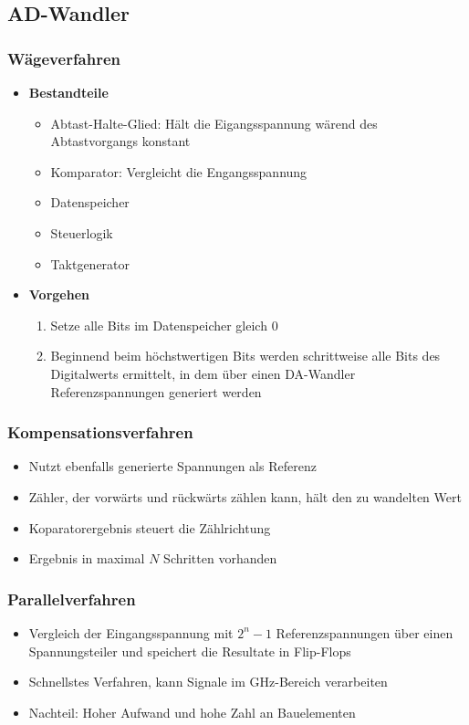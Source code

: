\subsection{AD-Wandler}

\subsubsection{Wägeverfahren}
\begin{itemize}
	\item \textbf{Bestandteile}
	\begin{itemize}
		\item Abtast-Halte-Glied: Hält die Eigangsspannung wärend des Abtastvorgangs konstant
		\item Komparator: Vergleicht die Engangsspannung
		\item Datenspeicher
		\item Steuerlogik
		\item Taktgenerator
	\end{itemize}
	\item \textbf{Vorgehen}
	\begin{enumerate}
		\item Setze alle Bits im Datenspeicher gleich $0$
		\item Beginnend beim höchstwertigen Bits werden schrittweise alle Bits des Digitalwerts ermittelt, in dem über einen DA-Wandler Referenzspannungen generiert werden
	\end{enumerate}
\end{itemize}

\subsubsection{Kompensationsverfahren}
\begin{itemize}
	\item Nutzt ebenfalls generierte Spannungen als Referenz
	\item Zähler, der vorwärts und rückwärts zählen kann, hält den zu wandelten Wert
	\item Koparatorergebnis steuert die Zählrichtung
	\item Ergebnis in maximal $N$ Schritten vorhanden
\end{itemize}

\subsubsection{Parallelverfahren}
\begin{itemize}
	\item Vergleich der Eingangsspannung mit $2^n-1$ Referenzspannungen über einen Spannungsteiler und speichert die Resultate in Flip-Flops
	\item Schnellstes Verfahren, kann Signale im GHz-Bereich verarbeiten
	\item Nachteil: Hoher Aufwand und hohe Zahl an Bauelementen
\end{itemize}

